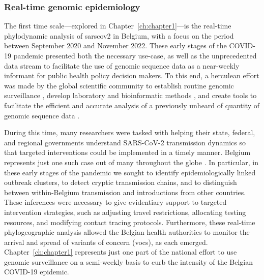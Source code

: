 \subsubsection{Real-time genomic epidemiology}
The first time scale---explored in Chapter~\ref{ch:chapter1}---is the real-time phylodynamic analysis of \gls{sarscov2} in Belgium, with a focus on the period between September 2020 and November 2022.
These early stages of the COVID-19 pandemic presented both the necessary use-case, as well as the unprecedented data stream \citep{brito2022global} to facilitate the use of genomic sequence data as a near-weekly informant for public health policy decision makers.
To this end, a herculean effort was made by the global scientific community to establish routine genomic surveillance \citep{smith2020integrated,deng2020genomic,tegally2022evolving}, develop laboratory and bioinformatic methods \citep{wang2020establishment,tyson2020improvements,chiara2021next}, and create tools to facilitate the efficient and accurate analysis of a previously unheard of quantity of genomic sequence data \citep{shu2017gisaid,minh2020iq,aksamentov2021nextclade}.

During this time, many researchers were tasked with helping their state, federal, and regional governments understand SARS-CoV-2 transmission dynamics so that targeted interventions could be implemented in a timely manner.
Belgium represents just one such case out of many throughout the globe \citep{giovanetti2022genomic,lu2020genomic,da2021genomic,alteri2021genomic,geoghegan2020genomic}.
In particular, in these early stages of the pandemic we sought to identify epidemiologically linked outbreak clusters, to detect cryptic transmission chains, and to distinguish between within-Belgium transmission and introductions from other countries.
These inferences were necessary to give evidentiary support to targeted intervention strategies, such as adjusting travel restrictions, allocating testing resources, and modifying contact tracing protocols.
Furthermore, these real-time phylogeographic analysis allowed the Belgian health authorities to monitor the arrival and spread of variants of concern (\gls{voc}s), as each emerged.
Chapter~\ref{ch:chapter1} represents just one part of the national effort to use genomic surveillance on a semi-weekly basis to curb the intensity of the Belgian COVID-19 epidemic.

